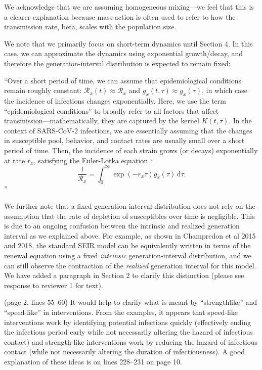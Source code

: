 \documentclass[12pt]{article}
\newcommand{\RR}{\ensuremath{{\mathcal R}}\xspace}
\newcommand{\dd}[1]{\ensuremath{\, \mathrm{d}#1}}
\newcommand{\dtau}{\dd{\tau}}
\newcommand{\revtext}{\textsf}
\begin{document}
We acknowledge that we are assuming homogeneous mixing---we feel that this is a clearer explanation because mass-action is often used to refer to how the transmission rate, beta, scales with the population size.

We note that we primarily focus on short-term dynamics until Section 4.
In this case, we can approximate the dynamics using exponential growth/decay, and therefore the generation-interval distribution is expected to remain fixed:

``Over a short period of time, we can assume that epidemiological conditions remain roughly constant: $\RR_x(t) \approx \RR_x$ and $g_x(t, \tau) \approx g_x(\tau)$, in which case the incidence of infections changes exponentially.
Here, we use the term ``epidemiological conditions'' to broadly refer to all factors that affect transmission---mathematically, they are captured by the kernel $K(t, \tau)$.
In the context of SARS-CoV-2 infections, we are essentially assuming that the changes in susceptible pool, behavior, and contact rates are usually small over a short period of time.
Then, the incidence of each strain grows (or decays) exponentially at rate $r_x$, satisfying the Euler-Lotka equation \citep{wallinga2007generation}:
\begin{equation}
\frac{1}{\RR_x} = \int_0^\infty \exp(- r_x \tau) g_x(\tau) \dtau.
\end{equation}''

We further note that a fixed generation-interval distribution does not rely on the assumption that the rate of depletion of susceptibles over time is negligible.
This is due to an ongoing confusion between the intrinsic and realized generation interval as we explained above.
For example, as shown in Champredon et al 2015 and 2018, the standard SEIR model can be equivalently written in terms of the renewal equation using a fixed \emph{intrinsic} generation-interval distribution, and we can still observe the contraction of the \emph{realized} generation interval for this model.
We have added a paragraph in Section 2 to clarify this distinction (please see response to reviewer 1 for text).

\revtext{(page 2, lines 55–60) It would help to clarify what is meant by “strengthlike” and “speed-like” in interventions. From the examples, it appears that
speed-like interventions work by identifying potential infections quickly
(effectively ending the infectious period early while not necessarily altering
the hazard of infectious contact) and strength-like interventions work by
reducing the hazard of infectious contact (while not necessarily altering
the duration of infectiousness). A good explanation of these ideas is on
lines 228–231 on page 10.}
\end{document}
